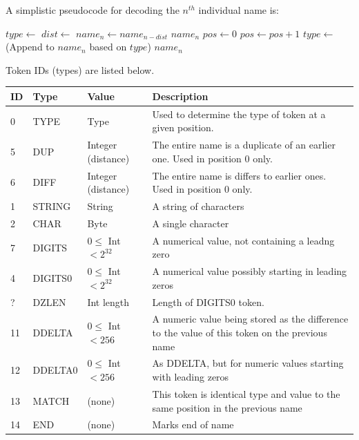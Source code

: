 \documentclass[a4paper]{article}
\begin{document}
A simplistic pseudocode for decoding the $n^{th}$ individual name is:

\begin{algorithmic}[1]
  \State $type \gets$ 
  \State $dist \gets$ 
    \State $name_n \gets name_{n-dist}$
    \State \Return $name_n$
  \EndIf
  \Statex
  \State $pos \gets 0$
  \Repeat
    \State $pos \gets pos+1$
    \State $type \gets$ 
    \State (Append to $name_n$ based on $type$)
  \State \Return $name_n$
  \EndFunction
\end{algorithmic}


Token IDs (types) are listed below.

\begin{tabular}{lllp{10cm}}
\hline
\textbf{ID} & \textbf{Type} & \textbf{Value} & \textbf{Description}\\
\hline
 0 & TYPE    & Type    & Used to determine the type of token at a given position. \\
\hline
 5 & DUP     & Integer (distance) & The entire name is a duplicate of an earlier one.  Used in position 0 only.\\
 6 & DIFF    & Integer (distance) & The entire name is differs to earlier ones.  Used in position 0 only.\\
\hline
 1 & STRING  & String  & A string of characters \\
 2 & CHAR    & Byte    & A single character \\
 7 & DIGITS  & $0 \le$ Int $< 2^{32}$ & A numerical value, not containing a leadng zero \\
 4 & DIGITS0 & $0 \le$ Int $< 2^{32}$ & A numerical value possibly starting in leading zeros \\
 ? & DZLEN   & Int length & Length of DIGITS0 token.\\
11 & DDELTA  & $0 \le$ Int $< 256$   & A numeric value being stored as the difference to the value of this token on the previous name \\
12 & DDELTA0 & $0 \le$ Int $< 256$ & As DDELTA, but for numeric values starting with leading zeros \\
13 & MATCH   & (none) & This token is identical type and value to the same position in the previous name \\
14 & END     & (none) & Marks end of name\\
\hline
\end{tabular}
\end{document}
